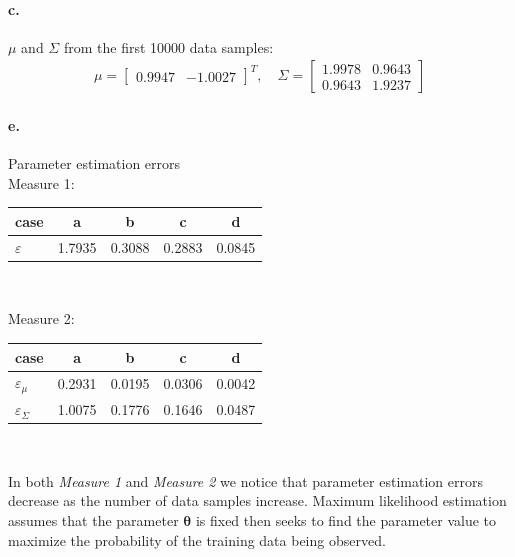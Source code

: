 \documentclass[a4paper]{article}
\begin{document}
\paragraph{c.} $\mu$ and $\Sigma$ from the first 10000 data samples: \\
\begin{align*}
	\mu = \begin{bmatrix}
		0.9947 & -1.0027
	\end{bmatrix}^{T}, \quad
	\Sigma = \begin{bmatrix}
		1.9978  &  0.9643 \\
		0.9643  &  1.9237
	\end{bmatrix}
\end{align*}

\paragraph{e.} Parameter estimation errors \\

Measure 1:
	\begin{tabular}{l *{4}{c}}
			case      &   a    &   b    &   c    &   d    \\ \hline
		$\varepsilon$ & 1.7935 & 0.3088 & 0.2883 & 0.0845
	\end{tabular} \\
\vspace{2em}
 
Measure 2:
	\begin{tabular}{l *{4}{c}}
				case            &   a    &   b    &   c    &   d    \\ \hline
		$\varepsilon _{\mu}$    & 0.2931 & 0.0195 & 0.0306 & 0.0042 \\ 
		$\varepsilon _{\Sigma}$ & 1.0075 & 0.1776 & 0.1646 & 0.0487 
	\end{tabular} \\
\vspace{2em}

In both \emph{Measure 1} and \emph{Measure 2} we notice that parameter estimation errors decrease as the number of data samples increase. Maximum likelihood estimation assumes that the parameter $\boldsymbol{\theta}$ is fixed then seeks to find the parameter value to maximize the probability of the training data being observed.

\end{document}

